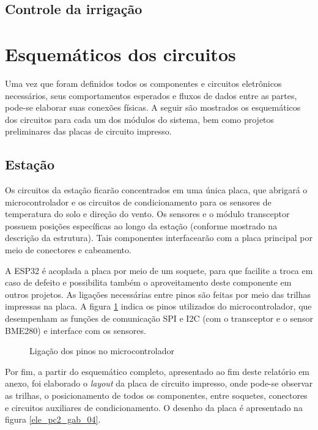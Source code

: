 	\subsection{Controle da irrigação}

\section{Esquemáticos dos circuitos}
	Uma vez que foram definidos todos os componentes e circuitos eletrônicos necessários, seus comportamentos esperados e fluxos de dados entre as partes, pode-se elaborar suas conexões físicas. A seguir são mostrados os esquemáticos dos circuitos para cada um dos módulos do sistema, bem como projetos preliminares das placas de circuito impresso.
	
	
	\subsection{Estação}
Os circuitos da estação ficarão concentrados em uma única placa, que abrigará o microcontrolador  e os circuitos de condicionamento para os sensores de temperatura do solo e direção do vento.  Os sensores e o módulo transceptor possuem posições específicas ao longo da estação (conforme mostrado na descrição da estrutura). Tais componentes interfacearão  com a placa principal por meio de conectores e cabeamento. 


A ESP32 é acoplada a placa por meio de um soquete, para que facilite a troca em caso de defeito e possibilita também o aproveitamento deste componente em outros projetos. As ligações necessárias entre pinos são feitas por meio das trilhas impressas na placa. A figura \ref{ele_pc2_gab_03} indica os pinos utilizados do microcontrolador, que desempenham as funções de comunicação SPI e I2C (com o transceptor e o sensor BME280) e interface com os sensores.  

\begin{figure}[H]
	\centering
	\caption{Ligação dos pinos no microcontrolador}
	\label{ele_pc2_gab_03}
\end{figure}

Por fim, a partir do esquemático completo, apresentado ao fim deste relatório em anexo, foi elaborado o \emph{layout} da placa de circuito impresso, onde pode-se observar as trilhas, o posicionamento de todos os componentes, entre soquetes, conectores e circuitos auxiliares de condicionamento. O desenho da placa é apresentado na figura \ref{ele_pc2_gab_04}.


